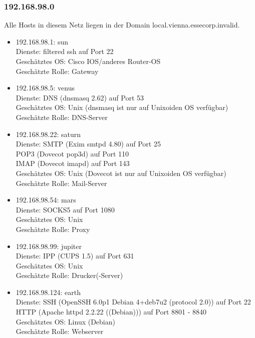\documentclass[12pt,a4paper,titlepage,oneside]{scrartcl}
\begin{document}
\subsubsection{192.168.98.0}
Alle Hosts in diesem Netz liegen in der Domain local.vienna.essecorp.invalid.
\begin{itemize}
	\item 192.168.98.1: sun
	\\Dienste: filtered ssh auf Port 22
	\\Geschätztes OS: Cisco IOS/anderes Router-OS
	\\Geschätzte Rolle: Gateway
	
	\item 192.168.98.5: venus
	\\Dienste: DNS (dnsmasq 2.62) auf Port 53
	\\Geschätztes OS: Unix (dnsmasq ist nur auf Unixoiden OS verfügbar)
	\\Geschätzte Rolle: DNS-Server
	
	\item 192.168.98.22: saturn
	\\Dienste: SMTP (Exim smtpd 4.80) auf Port 25
	\\POP3 (Dovecot pop3d) auf Port 110
	\\IMAP (Dovecot imapd) auf Port 143
	\\Geschätztes OS: Unix (Dovecot ist nur auf Unixoiden OS verfügbar)
	\\Geschätzte Rolle: Mail-Server
	
	\item 192.168.98.54: mars
	\\Dienste: SOCKS5 auf Port 1080
	\\Geschätztes OS: Unix
	\\Geschätzte Rolle: Proxy
	
	\item 192.168.98.99: jupiter
	\\Dienste: IPP (CUPS 1.5) auf Port 631
	\\Geschätztes OS: Unix
	\\Geschätzte Rolle: Drucker(-Server)
	
	\item 192.168.98.124: earth
	\\Dienste: SSH (OpenSSH 6.0p1 Debian 4+deb7u2 (protocol 2.0)) auf Port 22
	\\HTTP (Apache httpd 2.2.22 ((Debian))) auf Port 8801 - 8840
	\\Geschätztes OS: Linux (Debian)
	\\Geschätzte Rolle: Webserver
	

\end{itemize}
\end{document}
